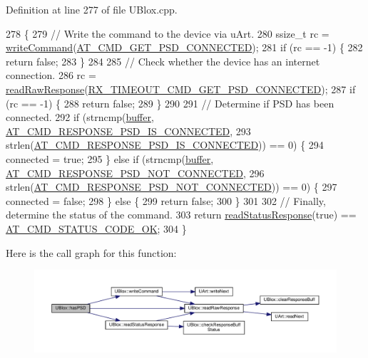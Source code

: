 Definition at line 277 of file U\+Blox.\+cpp.


\begin{DoxyCode}
278 \{
279     \textcolor{comment}{// Write the command to the device via uArt.}
280     ssize\_t rc = \hyperlink{class_u_blox_af604d1897a66192bf1c2a11997f2634d}{writeCommand}(\hyperlink{_u_blox_8cpp_a3ef4cda11e91847283a7ed3c43d0d903}{AT\_CMD\_GET\_PSD\_CONNECTED});
281     \textcolor{keywordflow}{if} (rc == -1) \{
282         \textcolor{keywordflow}{return} \textcolor{keyword}{false};
283     \}
284 
285     \textcolor{comment}{// Check whether the device has an internet connection.}
286     rc = \hyperlink{class_u_blox_ab4a7ab4b8922d91e23f273ae160c1bed}{readRawResponse}(\hyperlink{_u_blox_8cpp_ab65ecdc7509e7b8f4a71ea24f69979bf}{RX\_TIMEOUT\_CMD\_GET\_PSD\_CONNECTED});
287     \textcolor{keywordflow}{if} (rc == -1) \{
288         \textcolor{keywordflow}{return} \textcolor{keyword}{false};
289     \}
290 
291     \textcolor{comment}{// Determine if PSD has been connected.}
292     \textcolor{keywordflow}{if} (strncmp(\hyperlink{class_u_blox_a6ca4b90f3dc4e856181dce1ebda6f82c}{buffer}, \hyperlink{_u_blox_8cpp_af95f84a28382d34c8d3369259eb0fe87}{AT\_CMD\_RESPONSE\_PSD\_IS\_CONNECTED},
293                 strlen(\hyperlink{_u_blox_8cpp_af95f84a28382d34c8d3369259eb0fe87}{AT\_CMD\_RESPONSE\_PSD\_IS\_CONNECTED})) == 0) \{
294         connected = \textcolor{keyword}{true};
295     \} \textcolor{keywordflow}{else} \textcolor{keywordflow}{if} (strncmp(\hyperlink{class_u_blox_a6ca4b90f3dc4e856181dce1ebda6f82c}{buffer}, \hyperlink{_u_blox_8cpp_af39fc0f137b69f6044ec78734d850c38}{AT\_CMD\_RESPONSE\_PSD\_NOT\_CONNECTED},
296                        strlen(\hyperlink{_u_blox_8cpp_af39fc0f137b69f6044ec78734d850c38}{AT\_CMD\_RESPONSE\_PSD\_NOT\_CONNECTED})) == 0) \{
297         connected = \textcolor{keyword}{false};
298     \} \textcolor{keywordflow}{else} \{
299         \textcolor{keywordflow}{return} \textcolor{keyword}{false};
300     \}
301 
302     \textcolor{comment}{// Finally, determine the status of the command.}
303     \textcolor{keywordflow}{return} \hyperlink{class_u_blox_a4eaca5b1b1c4b5b6f6164b220dd43e0b}{readStatusResponse}(\textcolor{keyword}{true}) == \hyperlink{_u_blox_8cpp_a6ebc1682eb6b9964fccb4a61688ff307}{AT\_CMD\_STATUS\_CODE\_OK};
304 \}
\end{DoxyCode}
Here is the call graph for this function\+:
\nopagebreak
\begin{figure}[H]
\begin{center}
\leavevmode
\includegraphics[width=350pt]{da/df6/class_u_blox_ae49b51a602a327b5eff5b04d2ccaec20_cgraph}
\end{center}
\end{figure}
